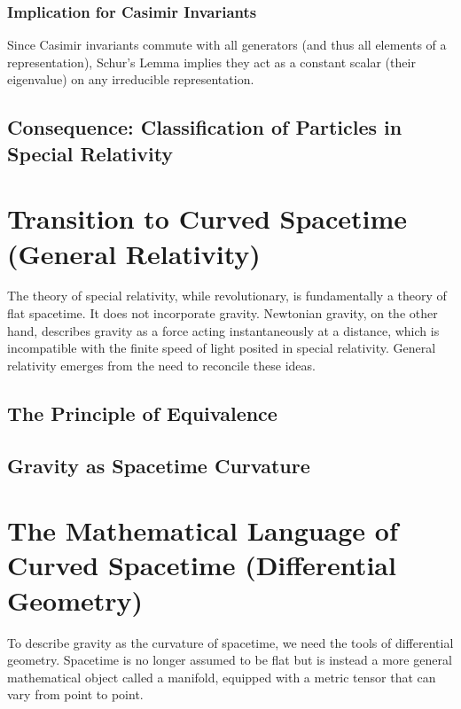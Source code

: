 \documentclass{amsart}
\theoremstyle{definition}
\theoremstyle{remark}
\begin{document}
\subsubsection{Implication for Casimir Invariants}
\label{subsubsec:schur_implication_casimir}
Since Casimir invariants commute with all generators (and thus all elements of a representation), Schur's Lemma implies they act as a constant scalar (their eigenvalue) on any irreducible representation.

\subsection{Consequence: Classification of Particles in Special Relativity}
\label{subsec:particle_classification_sr}


\section{Transition to Curved Spacetime (General Relativity)}
\label{sec:transition_gr}
The theory of special relativity, while revolutionary, is fundamentally a theory of flat spacetime.
It does not incorporate gravity.
Newtonian gravity, on the other hand, describes gravity as a force acting instantaneously at a distance, which is incompatible with the finite speed of light posited in special relativity.
General relativity emerges from the need to reconcile these ideas.

\subsection{The Principle of Equivalence}

\subsection{Gravity as Spacetime Curvature}

\section{The Mathematical Language of Curved Spacetime (Differential Geometry)}
\label{sec:math_gr}
To describe gravity as the curvature of spacetime, we need the tools of differential geometry.
Spacetime is no longer assumed to be flat but is instead a more general mathematical object called a manifold, equipped with a metric tensor that can vary from point to point.
\end{document}

